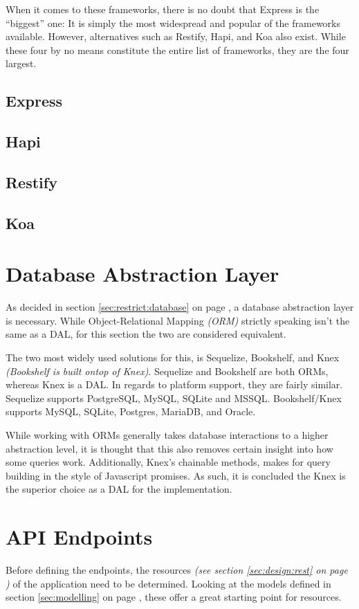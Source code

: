 		When it comes to these frameworks, there is no doubt that Express is the ``biggest'' one: It is simply the most widespread and popular of the frameworks available. However, alternatives such as Restify, Hapi, and Koa also exist. While these four by no means constitute the entire list of frameworks, they are the four largest.



		\subsection{Express}
		\subsection{Hapi}
		\subsection{Restify}
		\subsection{Koa}


	\section{Database Abstraction Layer}
		As decided in section \ref{sec:restrict:database} on page \pageref{sec:restrict:database}, a database abstraction layer is necessary. While Object-Relational Mapping \emph{(ORM)} strictly speaking isn't the same as a DAL, for this section the two are considered equivalent.

		The two most widely used solutions for this, is Sequelize, Bookshelf, and Knex \emph{(Bookshelf is built ontop of Knex)}. Sequelize and Bookshelf are both ORMs, whereas Knex is a DAL. In regards to platform support, they are fairly similar. Sequelize supports PostgreSQL, MySQL, SQLite and MSSQL. Bookshelf/Knex supports MySQL, SQLite, Postgres, MariaDB, and Oracle.

		While working with ORMs generally takes database interactions to a higher abstraction level, it is thought that this also removes certain insight into how some queries work. Additionally, Knex's chainable methods, makes for query building in the style of Javascript promises. As such, it is concluded the Knex is the superior choice as a DAL for the implementation.

	\section{API Endpoints}
		\label{sec:api}
		Before defining the endpoints, the resources \emph{(see section \ref{sec:design:rest} on page \pageref{sec:design:rest})} of the application need to be determined. Looking at the models defined in section \ref{sec:modelling} on page \pageref{sec:modelling}, these offer a great starting point for resources.


